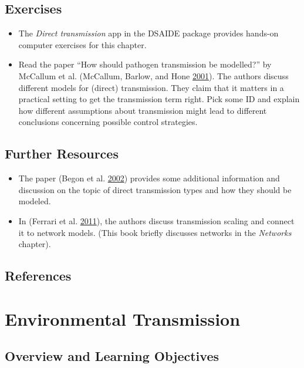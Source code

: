\documentclass[]{book}
\providecommand{\tightlist}{%
  \setlength{\itemsep}{0pt}\setlength{\parskip}{0pt}}
\theoremstyle{definition}
\theoremstyle{definition}
\theoremstyle{definition}
\theoremstyle{remark}
\begin{document}
\section{Exercises}\label{exercises-5}

\begin{itemize}
\tightlist
\item
  The \emph{Direct transmission} app in the DSAIDE package provides
  hands-on computer exercises for this chapter.
\item
  Read the paper ``How should pathogen transmission be modelled?'' by
  McCallum et al. (McCallum, Barlow, and Hone
  \protect\hyperlink{ref-mccallum01}{2001}). The authors discuss
  different models for (direct) transmission. They claim that it matters
  in a practical setting to get the transmission term right. Pick some
  ID and explain how different assumptions about transmission might lead
  to different conclusions concerning possible control strategies.
\end{itemize}

\section{Further Resources}\label{further-resources-5}

\begin{itemize}
\tightlist
\item
  The paper (Begon et al. \protect\hyperlink{ref-begon02}{2002})
  provides some additional information and discussion on the topic of
  direct transmission types and how they should be modeled.
\item
  In (Ferrari et al. \protect\hyperlink{ref-ferrari11}{2011}), the
  authors discuss transmission scaling and connect it to network models.
  (This book briefly discusses networks in the \emph{Networks }
  chapter).
\end{itemize}

\section{References}\label{references-6}

\chapter{Environmental Transmission}\label{environmental-transmission-1}

\section{Overview and Learning
Objectives}\label{overview-and-learning-objectives-6}
\end{document}

